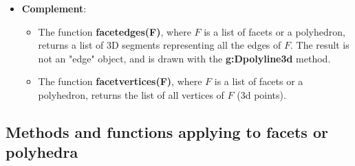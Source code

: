 \begin{itemize}
    \item \textbf{Complement}:
\begin{itemize}
    \item The function \textbf{facetedges(F)}, where $F$ is a list of facets or a polyhedron, returns a list of 3D segments representing all the edges of $F$. The result is not an "edge" object, and is drawn with the \textbf{g:Dpolyline3d} method.     \item The function \textbf{facetvertices(F)}, where $F$ is a list of facets or a polyhedron, returns the list of all vertices of $F$ (3d points).
\end{itemize}
\end{itemize}

\subsection{Methods and functions applying to facets or polyhedra}

